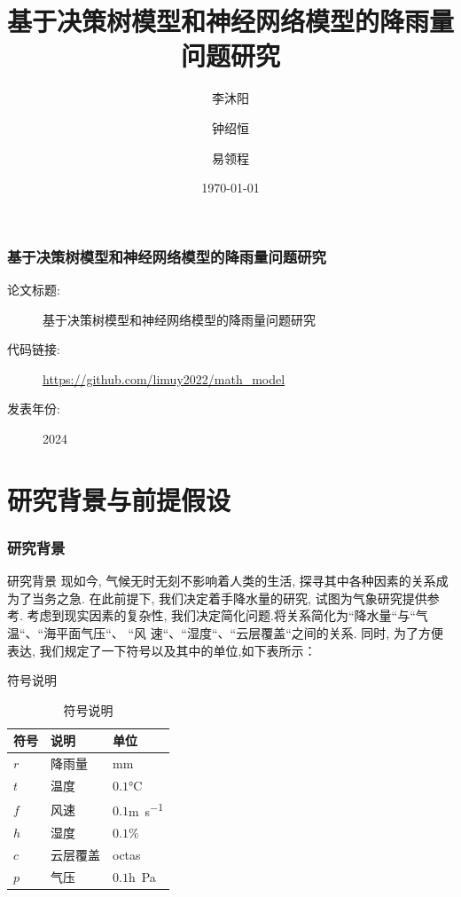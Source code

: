 \documentclass[10pt]{beamer}
\title[]{ {\Large 基于决策树模型和神经网络模型的降雨量问题研究 }}
\author{李沐阳 \and 钟绍恒 \and 易领程}
\institute[VFU] {}
\date{\today} %
\begin{document}
{
\frame{\titlepage}
}





\begin{frame}
	\frametitle{基于决策树模型和神经网络模型的降雨量问题研究}

	\begin{description}
		\item[论文标题:]  基于决策树模型和神经网络模型的降雨量问题研究
		\item[代码链接:]   \url{https://github.com/limuy2022/math_model}
		\item[发表年份:]   2024
	\end{description}
\end{frame}


\section{研究背景与前提假设}
\begin{frame}
	\frametitle{研究背景}
	\begin{block}{研究背景}
		现如今, 气候无时无刻不影响着人类的生活, 探寻其中各种因素的关系成为了当务之急.
		在此前提下, 我们决定着手降水量的研究, 试图为气象研究提供参考.
		考虑到现实因素的复杂性, 我们决定简化问题.将关系简化为``降水量``与``气温``、``海平面气压``、 ``风
		速``、``湿度``、``云层覆盖``之间的关系.
		同时, 为了方便表达, 我们规定了一下符号以及其中的单位,如下表所示：
	\end{block}
	\begin{block}{符号说明}
		\begin{table}[h!]
			\centering
			\caption{符号说明}
			\begin{tabular}{p{6em}p{6em}l}
				\hline
				符号  & 说明   & 单位                          \\
				\hline
				$r$ & 降雨量  & \si{\milli\meter}           \\
				$t$ & 温度   & $0.1$\si{\degreeCelsius}    \\
				$f$ & 风速   & $0.1$\si{\meter\per\second} \\
				$h$ & 湿度   & $0.1\%$                     \\
				$c$ & 云层覆盖 & \si{octas}                  \\
				$p$ & 气压   & $0.1$\si{h\pascal}          \\
				\hline
			\end{tabular}
		\end{table}
	\end{block}
\end{frame}
\end{document}
